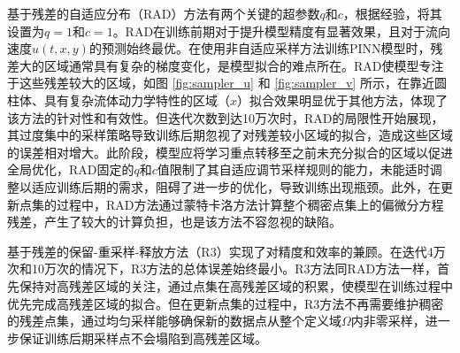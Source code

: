 基于残差的自适应分布（RAD）方法有两个关键的超参数$q$和$c$，根据经验，将其设置为$q=1$和$c=1$。RAD在训练前期对于提升模型精度有显著效果，且对于流向速度$u(t,x,y)$的预测始终最优。在使用非自适应采样方法训练PINN模型时，残差大的区域通常具有复杂的梯度变化，是模型拟合的难点所在。RAD使模型专注于这些残差较大的区域，如图 \ref{fig:sampler_u} 和 \ref{fig:sampler_v} 所示，在靠近圆柱体、具有复杂流体动力学特性的区域（$x$）拟合效果明显优于其他方法，体现了该方法的针对性和有效性。但迭代次数到达10万次时，RAD的局限性开始展现，其过度集中的采样策略导致训练后期忽视了对残差较小区域的拟合，造成这些区域的误差相对增大。此阶段，模型应将学习重点转移至之前未充分拟合的区域以促进全局优化，RAD固定的$q$和$c$值限制了其自适应调节采样规则的能力，未能适时调整以适应训练后期的需求，阻碍了进一步的优化，导致训练出现瓶颈。此外，在更新点集的过程中，RAD方法通过蒙特卡洛方法计算整个稠密点集上的偏微分方程残差，产生了较大的计算负担，也是该方法不容忽视的缺陷。

基于残差的保留-重采样-释放方法（R3）实现了对精度和效率的兼顾。在迭代4万次和10万次的情况下，R3方法的总体误差始终最小。R3方法同RAD方法一样，首先保持对高残差区域的关注，通过点集在高残差区域的积累，使模型在训练过程中优先完成高残差区域的拟合。但在更新点集的过程中，R3方法不再需要维护稠密的残差点集，通过均匀采样能够确保新的数据点从整个定义域$\varOmega$内非零采样，进一步保证训练后期采样点不会塌陷到高残差区域。

